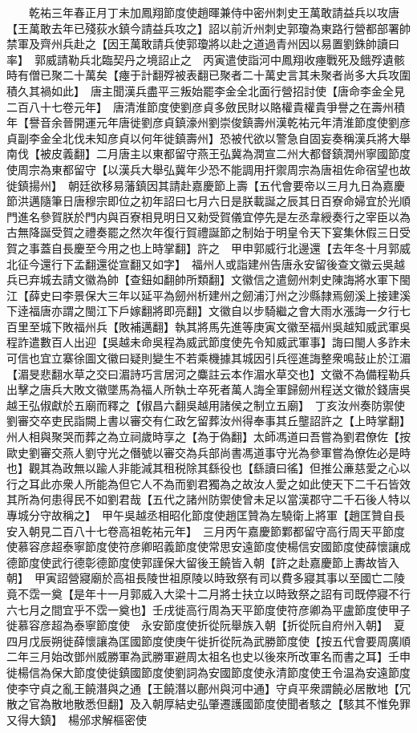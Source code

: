 　　乾祐三年春正月丁未加鳳翔節度使趙暉兼侍中密州刺史王萬敢請益兵以攻唐【王萬敢去年已殘荻水鎮今請益兵攻之】詔以前沂州刺史郭瓊為東路行營都部署帥禁軍及齊州兵赴之【因王萬敢請兵使郭瓊將以赴之道過青州因以易置劉銖帥讀曰率】　郭威請勒兵北臨契丹之境詔止之　丙寅遣使詣河中鳳翔收瘞戰死及餓殍遺骸時有僧已聚二十萬矣【瘞于計翻殍被表翻已聚者二十萬史言其未聚者尚多大兵攻圍積久其禍如此】　唐主聞漢兵盡平三叛始罷李金全北面行營招討使【唐命李金全見二百八十七卷元年】　唐清淮節度使劉彦貞多斂民財以賂權貴權貴爭譽之在壽州積年【譽音余晉開運元年唐徙劉彦貞鎮濠州劉崇俊鎮壽州漢乾祐元年清淮節度使劉彦貞副李金全北伐未知彦貞以何年徙鎮壽州】恐被代欲以警急自固妄奏稱漢兵將大舉南伐【被皮義翻】二月唐主以東都留守燕王弘冀為潤宣二州大都督鎮潤州寧國節度使周宗為東都留守【以漢兵大舉弘冀年少恐不能調用扞禦周宗為唐祖佐命宿望也故徙鎮揚州】　朝廷欲移易藩鎮因其請赴嘉慶節上壽【五代會要帝以三月九日為嘉慶節洪邁隨筆日唐穆宗即位之初年詔曰七月六日是朕載誕之辰其日百寮命婦宜於光順門進名參賀朕於門内與百寮相見明日又勑受賀儀宜停先是左丞韋綬奏行之宰臣以為古無降誕受賀之禮奏罷之然次年復行賀禮誕節之制始于明皇令天下宴集休假三日受賀之事蓋自長慶至今用之也上時掌翻】許之　甲申郭威行北邊還【去年冬十月郭威北征今還行下孟翻還從宣翻又如字】　福州人或詣建州告唐永安留後查文徽云吳越兵已弃城去請文徽為帥【查鈕如翻帥所類翻】文徽信之遣劒州刺史陳誨將水軍下閩江【薛史曰李景保大三年以延平為劒州析建州之劒浦汀州之沙縣隸焉劒溪上接建溪下逹福唐亦謂之閩江下戶嫁翻將即亮翻】文徽自以步騎繼之會大雨水漲誨一夕行七百里至城下敗福州兵【敗補邁翻】執其將馬先進等庚寅文徽至福州吳越知威武軍吳程詐遣數百人出迎【吳越未命吳程為威武節度使先令知威武軍事】誨曰閩人多詐未可信也宜立寨徐圖文徽曰疑則變生不若乘機據其城因引兵徑進誨整衆鳴鼔止於江湄【湄旻悲翻水草之交曰湄詩巧言居河之麋註云本作湄水草交也】文徽不為備程勒兵出擊之唐兵大敗文徽墜馬為福人所執士卒死者萬人誨全軍歸劒州程送文徽於錢唐吳越王弘俶獻於五廟而釋之【俶昌六翻吳越用諸侯之制立五廟】　丁亥汝州奏防禦使劉審交卒吏民詣闕上書以審交有仁政乞留葬汝州得奉事其丘壟詔許之【上時掌翻】州人相與聚哭而葬之為立祠歲時享之【為于偽翻】太師馮道曰吾嘗為劉君僚佐【按歐史劉審交燕人劉守光之僭號以審交為兵部尚書馮道事守光為參軍嘗為僚佐必是時也】觀其為政無以踰人非能減其租税除其繇役也【繇讀曰徭】但推公亷慈愛之心以行之耳此亦衆人所能為但它人不為而劉君獨為之故汝人愛之如此使天下二千石皆效其所為何患得民不如劉君哉【五代之諸州防禦使曾未足以當漢郡守二千石後人特以專城分守故稱之】　甲午吳越丞相昭化節度使趙匡贊為左驍衛上將軍【趙匡贊自長安入朝見二百八十七卷高祖乾祐元年】　三月丙午嘉慶節鄴都留守高行周天平節度使慕容彦超泰寧節度使符彦卿昭義節度使常思安遠節度使楊信安國節度使薛懷讓成德節度使武行德彰德節度使郭謹保大留後王饒皆入朝【許之赴嘉慶節上夀故皆入朝】　甲寅詔營寢廟於高祖長陵世祖原陵以時致祭有司以費多寢其事以至國亡二陵竟不霑一奠【是年十一月郭威入大梁十二月將士扶立以時致祭之詔有司既停寢不行六七月之間宜乎不霑一奠也】壬戌徙高行周為天平節度使符彦卿為平盧節度使甲子徙慕容彦超為泰寧節度使　永安節度使折從阮舉族入朝【折從阮自府州入朝】　夏四月戊辰朔徙薛懷讓為匡國節度使庚午徙折從阮為武勝節度使【按五代會要周廣順二年三月始改鄧州威勝軍為武勝軍避周太祖名也史以後來所改軍名而書之耳】壬申徙楊信為保大節度使徙鎮國節度使劉詞為安國節度使永清節度使王令温為安遠節度使李守貞之亂王饒潛與之通【王饒潛以鄜州與河中通】守貞平衆謂饒必居散地【冗散之官為散地散悉但翻】及入朝厚結史弘肇遷護國節度使聞者駭之【駭其不惟免罪又得大鎮】　楊邠求解樞密使